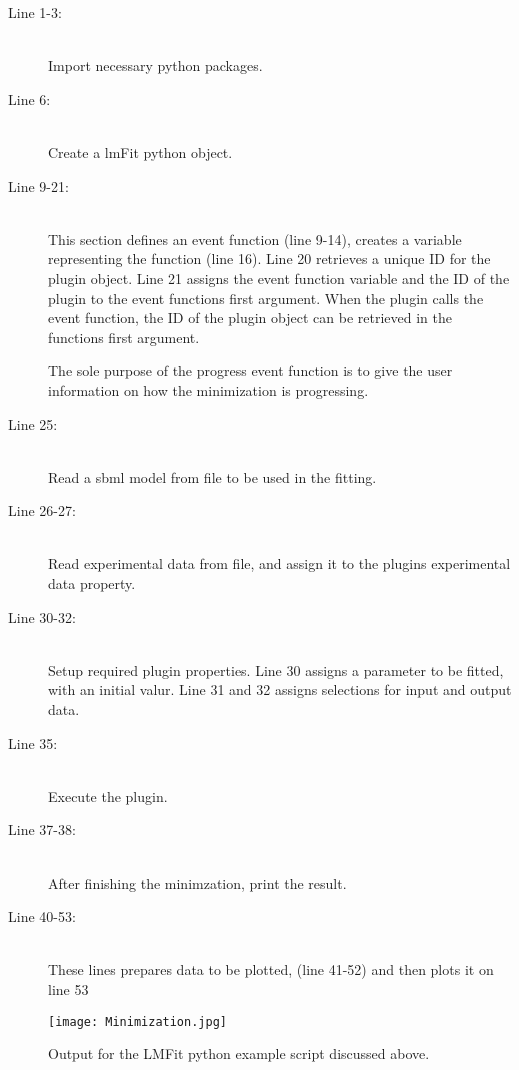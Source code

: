 \begin{description}
{
\setlength{}
}
\item[Line 1-3:] \hfill \\
    Import necessary python packages.
\item[Line 6:] \hfill \\
Create a lmFit python object.
\item[Line 9-21:]\hfill \\
 This section defines an event function (line 9-14), creates a 
variable representing the function (line 16). Line 20 retrieves a unique ID for the plugin object. Line 21 assigns the event function variable and the ID of the plugin to the event
functions first argument. 
When the plugin calls the event function, the ID of the plugin object can be retrieved in the functions first argument.

The sole purpose of the progress event function is to give the user information on how the minimization is progressing. 

\item[Line 25:] \hfill \\
Read a sbml model from file to be used in the fitting.
\item[Line 26-27:]\hfill \\
 Read experimental data from  file, and assign it to the plugins experimental data property.
\item[Line 30-32:]\hfill \\
 Setup required plugin properties. Line 30 assigns a parameter to be fitted, with an initial valur. Line 31 and 32 assigns selections for input and output data.
\item[Line 35:] \hfill \\
Execute the plugin.
\item[Line 37-38:]\hfill \\
 After finishing the minimzation, print the result.
\item[Line 40-53:]\hfill \\
 These lines prepares data to be plotted, (line 41-52) and then plots it on line 53

\end{description}

\begin{sidewaysfigure}
\centering
\texttt{[image: Minimization.jpg]}
\caption{Output for the LMFit python example script discussed above.}
\label{fig:lmfitFig}
\end{sidewaysfigure}







